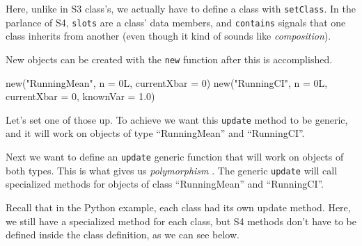 \documentclass[
  12pt,
]{krantz}
\makeatletter
\newenvironment{Shaded}{\begin{snugshade}}{\end{snugshade}}
\newcommand{\AttributeTok}[1]{\textcolor[rgb]{0.61,0.61,0.61}{#1}}
\newcommand{\DecValTok}[1]{\textcolor[rgb]{0.06,0.06,0.06}{#1}}
\newcommand{\FloatTok}[1]{\textcolor[rgb]{0.06,0.06,0.06}{#1}}
\newcommand{\FunctionTok}[1]{\textcolor[rgb]{0,0,0}{#1}}
\newcommand{\NormalTok}[1]{#1}
\newcommand{\StringTok}[1]{\textcolor[rgb]{0.5,0.5,0.5}{#1}}
\newenvironment{kframe}{%
\medskip{}
\setlength{\fboxsep}{.8em}
 \def\at@end@of@kframe{}%
 \ifinner\ifhmode%
  \def\at@end@of@kframe{\end{minipage}}%
  \begin{minipage}{\columnwidth}%
 \fi\fi%
 \def\FrameCommand##1{\hskip\@totalleftmargin \hskip-\fboxsep
 \colorbox{shadecolor}{##1}\hskip-\fboxsep
     \hskip-\linewidth \hskip-\@totalleftmargin \hskip\columnwidth}%
 \MakeFramed {\advance\hsize-\width
   \@totalleftmargin\z@ \linewidth\hsize
   \@setminipage}}%
 {\par\unskip\endMakeFramed%
 \at@end@of@kframe}
\renewenvironment{Shaded}{\begin{kframe}}{\end{kframe}}
\makeatother
\begin{document}
Here, unlike in S3 class's, we actually have to define a class with \texttt{setClass}. In the parlance of S4, \texttt{slots} are a class' data members, and \texttt{contains} signals that one class inherits from another (even though it kind of sounds like \emph{composition}).

New objects can be created with the \texttt{new} function after this is accomplished.

\begin{Shaded}
\begin{Highlighting}[]
\FunctionTok{new}\NormalTok{(}\StringTok{"RunningMean"}\NormalTok{, }\AttributeTok{n =}\NormalTok{ 0L, }\AttributeTok{currentXbar =} \DecValTok{0}\NormalTok{)}
\FunctionTok{new}\NormalTok{(}\StringTok{"RunningCI"}\NormalTok{, }\AttributeTok{n =}\NormalTok{ 0L, }\AttributeTok{currentXbar =} \DecValTok{0}\NormalTok{, }\AttributeTok{knownVar =} \FloatTok{1.0}\NormalTok{)}
\end{Highlighting}
\end{Shaded}

Let's set one of those up. To achieve we want this \texttt{update} method to be generic, and it will work on objects of type ``RunningMean'' and ``RunningCI''.

Next we want to define an \texttt{update} generic function that will work on objects of both types. This is what gives us \emph{polymorphism} . The generic \texttt{update} will call specialized methods for objects of class ``RunningMean'' and ``RunningCI''.

Recall that in the Python example, each class had its own update method. Here, we still have a specialized method for each class, but S4 methods don't have to be defined inside the class definition, as we can see below.
\end{document}
